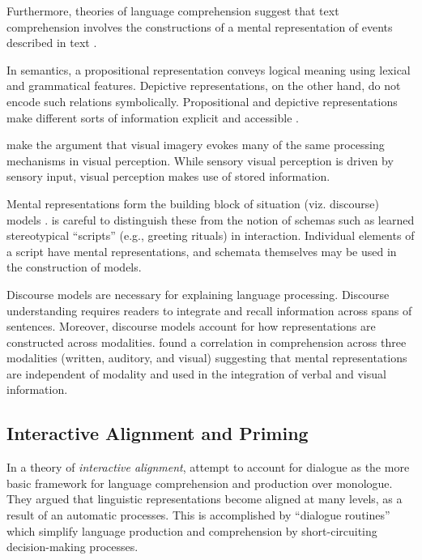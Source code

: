 Furthermore, theories of language comprehension suggest that text comprehension involves the constructions of a mental representation of events described in text  \citep{Zwaan:2002va,Kintsch:1978vz,vanDijk:1990tc}.  

In semantics, a propositional representation conveys logical meaning using lexical and grammatical features. Depictive representations, on the other hand, do not encode such relations symbolically. Propositional and depictive representations make different sorts of information explicit and accessible  \citep{Kosslyn:2006tj}. 

 \citet{Kosslyn:2006tj}  make the argument that visual imagery evokes many of the same processing mechanisms in visual perception. While sensory visual perception is driven by sensory input, visual perception makes use of stored information.

Mental representations form the building block of situation (viz. discourse) models  \citep{Zwaan:2002va,Zwaan:2013wk}. \citet{Zwaan:2013wk}  is careful to distinguish these from the notion of schemas such as learned stereotypical ``scripts'' (e.g., greeting rituals) in interaction. Individual elements of a script have mental representations, and schemata themselves may be used in the construction of models.

Discourse models are necessary for explaining language processing. Discourse understanding requires readers to integrate and recall information across spans of sentences. Moreover, discourse models account for how representations are constructed across modalities.  \citet*{Gernsbacher:2013vl,Zwaan:1999td}  found a correlation in comprehension across three modalities (written, auditory, and visual) suggesting that mental representations are independent of modality and used in the integration of verbal and visual information. 

\subsection{Interactive Alignment and Priming}
\label{interactivealignmentandpriming}

In a theory of \emph{interactive alignment},  \citet{Pickering:2003uy}  attempt to account for dialogue as the more basic framework for language comprehension and production over monologue. They argued that linguistic representations become aligned at many levels, as a result of an automatic processes. This is accomplished by ``dialogue routines'' which simplify language production and comprehension by short-circuiting decision-making processes.

